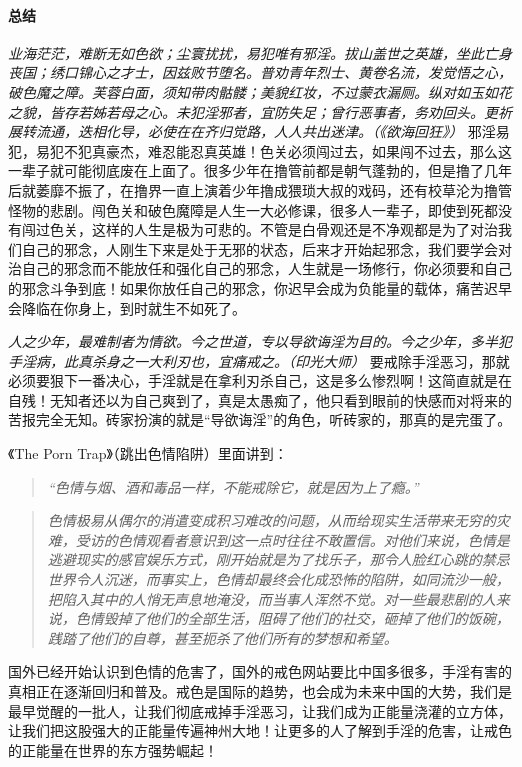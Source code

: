 \paragraph*{总结}

\textit{业海茫茫，难断无如色欲；尘寰扰扰，易犯唯有邪淫。拔山盖世之英雄，坐此亡身丧国；绣口锦心之才士，因兹败节堕名。普劝青年烈士、黄卷名流，发觉悟之心，破色魔之障。芙蓉白面，须知带肉骷髅；美貌红妆，不过蒙衣漏厕。纵对如玉如花之貌，皆存若姊若母之心。未犯淫邪者，宜防失足；曾行恶事者，务劝回头。更祈展转流通，迭相化导，必使在在齐归觉路，人人共出迷津。（《欲海回狂》）} 邪淫易犯，易犯不犯真豪杰，难忍能忍真英雄！色关必须闯过去，如果闯不过去，那么这一辈子就可能彻底废在上面了。很多少年在撸管前都是朝气蓬勃的，但是撸了几年后就萎靡不振了，在撸界一直上演着少年撸成猥琐大叔的戏码，还有校草沦为撸管怪物的悲剧。闯色关和破色魔障是人生一大必修课，很多人一辈子，即使到死都没有闯过色关，这样的人生是极为可悲的。不管是白骨观还是不净观都是为了对治我们自己的邪念，人刚生下来是处于无邪的状态，后来才开始起邪念，我们要学会对治自己的邪念而不能放任和强化自己的邪念，人生就是一场修行，你必须要和自己的邪念斗争到底！如果你放任自己的邪念，你迟早会成为负能量的载体，痛苦迟早会降临在你身上，到时就生不如死了。

\textit{人之少年，最难制者为情欲。今之世道，专以导欲诲淫为目的。今之少年，多半犯手淫病，此真杀身之一大利刃也，宜痛戒之。（印光大师）} 要戒除手淫恶习，那就必须要狠下一番决心，手淫就是在拿利刃杀自己，这是多么惨烈啊！这简直就是在自残！无知者还以为自己爽到了，真是太愚痴了，他只看到眼前的快感而对将来的苦报完全无知。砖家扮演的就是“导欲诲淫”的角色，听砖家的，那真的是完蛋了。

《The Porn Trap》（跳出色情陷阱）里面讲到：

\begin{quote}\it
    “色情与烟、酒和毒品一样，不能戒除它，就是因为上了瘾。”
\end{quote}

\begin{quote}\it
    色情极易从偶尔的消遣变成积习难改的问题，从而给现实生活带来无穷的灾难，受访的色情观看者意识到这一点时往往不敢置信。对他们来说，色情是逃避现实的感官娱乐方式，刚开始就是为了找乐子，那令人脸红心跳的禁忌世界令人沉迷，而事实上，色情却最终会化成恐怖的陷阱，如同流沙一般，把陷入其中的人悄无声息地淹没，而当事人浑然不觉。对一些最悲剧的人来说，色情毁掉了他们的全部生活，阻碍了他们的社交，砸掉了他们的饭碗，践踏了他们的自尊，甚至扼杀了他们所有的梦想和希望。
\end{quote}

国外已经开始认识到色情的危害了，国外的戒色网站要比中国多很多，手淫有害的真相正在逐渐回归和普及。戒色是国际的趋势，也会成为未来中国的大势，我们是最早觉醒的一批人，让我们彻底戒掉手淫恶习，让我们成为正能量浇灌的立方体，让我们把这股强大的正能量传遍神州大地！让更多的人了解到手淫的危害，让戒色的正能量在世界的东方强势崛起！

